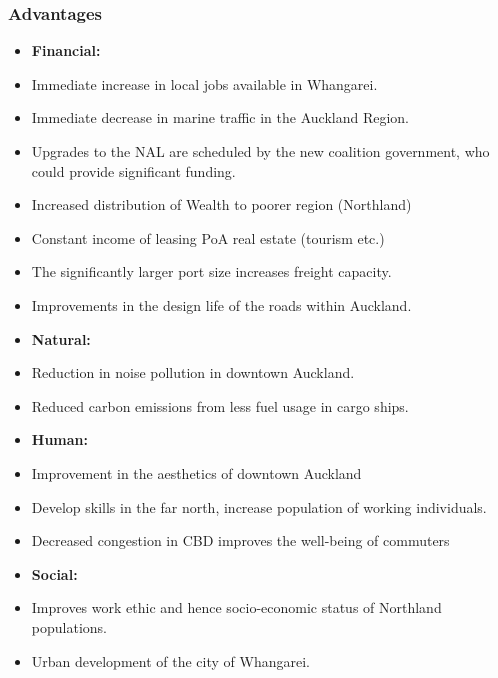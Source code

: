 \begin{multicols}{2}
    \subsubsection*{Advantages}
    \begin{itemize}[noitemsep]
        \item []\textbf{Financial: }
        \item{Immediate increase in local jobs available in Whangarei.}
        \item{Immediate decrease in marine traffic in the Auckland Region.}
        \item{Upgrades to the NAL are scheduled by the new coalition government, who could provide significant funding.}
        \item{Increased distribution of Wealth to poorer region (Northland)}
        \item{Constant income of leasing PoA real estate (tourism etc.)}
        \item{The significantly larger port size increases freight capacity.}
        \item{Improvements in the design life of the roads within Auckland. }
        
        
        \item []\textbf{Natural: }
        \item{Reduction in noise pollution in downtown Auckland.}
        \item{Reduced carbon emissions from less fuel usage in cargo ships.}
        
        
        \item []\textbf{Human: }
        \item{Improvement in the aesthetics of downtown Auckland}
        \item{Develop skills in the far north, increase population of working individuals.}
        \item{Decreased congestion in CBD improves the well-being of commuters}
        
        
        \item []\textbf{Social: }
        \item{Improves work ethic and hence socio-economic status of Northland populations.}
        \item{Urban development of the city of Whangarei.}
    \end{itemize}

\end{multicols}
